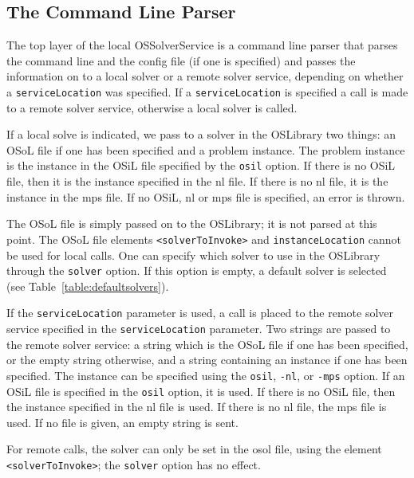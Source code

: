\subsection{The Command Line Parser}\label{section:commandlineparser}

The top layer of the local OSSolverService is a command line parser that parses the command line and
the config file (if one is specified) and passes the information on to a local solver or a remote solver service,
depending on whether a {\tt serviceLocation} was specified. If a 
{\tt serviceLocation} is specified a call is made to a remote solver service, otherwise a local solver is called.

\medskip

If a local solve is indicated, we pass to a solver in the OSLibrary two things: 
an OSoL file if one has been specified and a problem instance. The problem instance 
is the instance in the OSiL file specified by the {\tt osil} option. If there is no OSiL file, 
then it is the instance specified in the nl file. If there is no nl file, it is the 
instance in the mps file. If no OSiL, nl or mps file is specified, an error is thrown. 

The OSoL file is simply passed on to the OSLibrary; it is not parsed at this point. 
The OSoL file elements {\tt <solverToInvoke>} and {\tt instanceLocation} cannot be used for local calls.
One can specify which solver to use in the OSLibrary through the {\tt solver} option. If this 
option is empty, a default solver is selected (see Table~\ref{table:defaultsolvers}).

\medskip

If the {\tt serviceLocation} parameter is used, a call is placed to the remote solver service
specified in the {\tt serviceLocation} parameter. 
Two strings are passed to the remote solver service: a string which is the OSoL file 
if one has been specified, or the empty string otherwise, and a string containing an 
instance if one has been specified. The instance can be specified using the {\tt osil}, {\tt -nl}, or 
{\tt -mps} option. If an OSiL file is specified in the {\tt osil} option, it is used. If there is no 
OSiL file, then the instance specified in the nl file is used. If there is no nl file,  
the mps file is used. If no file is given, an empty string is sent.

For remote calls, the solver can only be set in the osol file, using the element {\tt <solverToInvoke>};
the {\tt solver} option has no effect.



